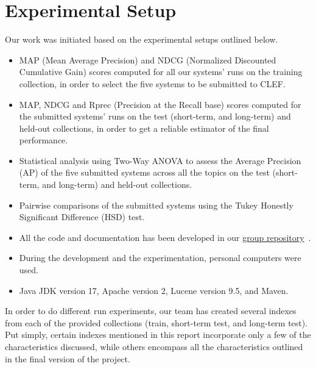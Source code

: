 \section{Experimental Setup}\label{sec:setup}

Our work was initiated based on the experimental setups outlined below.
\begin{itemize}
	\item MAP (Mean Average Precision) and NDCG (Normalized Discounted Cumulative Gain) scores computed for all our
	systems' runs on the training collection, in order to select the five systems to be submitted to CLEF\@.
	\item MAP, NDCG and Rprec (Precision at the Recall
	base) scores computed for the submitted systems' runs on the test (short-term, and long-term) and held-out
	collections, in order to get a reliable estimator of the final performance.
	\item Statistical analysis using Two-Way ANOVA to assess the Average Precision (AP) of the five submitted systems
	across all the topics on the test (short-term, and long-term) and held-out collections.
	\item Pairwise comparisons of the submitted systems using the Tukey Honestly Significant Difference (HSD) test.
	\item All the code and documentation has been developed in our
	\href{https://bitbucket.org/upd-dei-stud-prj/seupd2223-jihuming/src/master/}{group repository}~\cite{jihuming}.
	\item During the development and the experimentation, personal computers were used.
	\item Java JDK version 17, Apache version 2, Lucene version 9.5, and Maven.
\end{itemize}

In order to do different run experiments, our team has created several indexes from each of the provided collections
(train, short-term test, and long-term test).
Put simply, certain indexes mentioned in this report incorporate only a few of the characteristics discussed, while
others encompass all the characteristics outlined in the final version of the project.\\

